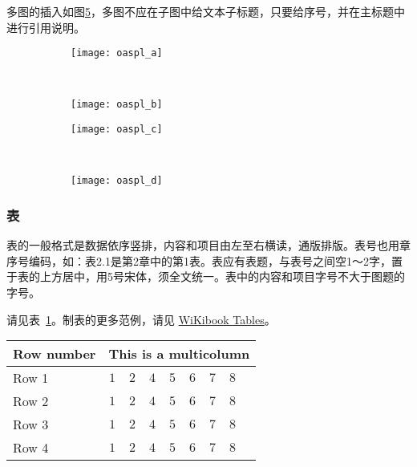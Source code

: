 多图的插入如图\ref{fig:oaspl}，多图不应在子图中给文本子标题，只要给序号，并在主标题中进行引用说明。
\begin{figure}[!htbp]
    \centering
    \begin{subfigure}[b]{0.35\textwidth}
      \texttt{[image: oaspl\_a]}
      \caption{}
      \label{fig:oaspl_a}
    \end{subfigure}%
    ~%
    \begin{subfigure}[b]{0.35\textwidth}
      \texttt{[image: oaspl\_b]}
      \caption{}
      \label{fig:oaspl_b}
    \end{subfigure}
    \begin{subfigure}[b]{0.35\textwidth}
      \texttt{[image: oaspl\_c]}
      \caption{}
      \label{fig:oaspl_c}
    \end{subfigure}%
    ~%
    \begin{subfigure}[b]{0.35\textwidth}
      \texttt{[image: oaspl\_d]}
      \caption{}
      \label{fig:oaspl_d}
    \end{subfigure}
    \label{fig:oaspl}
\end{figure}

\subsubsection{表}
表的一般格式是数据依序竖排，内容和项目由左至右横读，通版排版。表号也用章序号编码，如：表2.1是第2章中的第1表。表应有表题，与表号之间空1～2字，置于表的上方居中，用5号宋体，须全文统一。表中的内容和项目字号不大于图题的字号。

请见表~\ref{tab:sample}。制表的更多范例，请见 \href{https://en.wikibooks.org/wiki/LaTeX/Tables}{WiKibook Tables}。
\begin{table}[!htbp]
    \centering
    \footnotesize%
    \setlength{\tabcolsep}{4pt}%
    \renewcommand{\arraystretch}{1.2}%
    \begin{tabular}{lcccccccc}
        \hline
        Row number & \multicolumn{8}{c}{This is a multicolumn} \\
        \hline
        Row 1 & $1$ & $2$ & $4$ & $5$ & $6$ & $7$ & $8$\\
        Row 2 & $1$ & $2$ & $4$ & $5$ & $6$ & $7$ & $8$\\
        Row 3 & $1$ & $2$ & $4$ & $5$ & $6$ & $7$ & $8$\\
        Row 4 & $1$ & $2$ & $4$ & $5$ & $6$ & $7$ & $8$\\
        \hline
    \end{tabular}
    \label{tab:sample}
\end{table}


